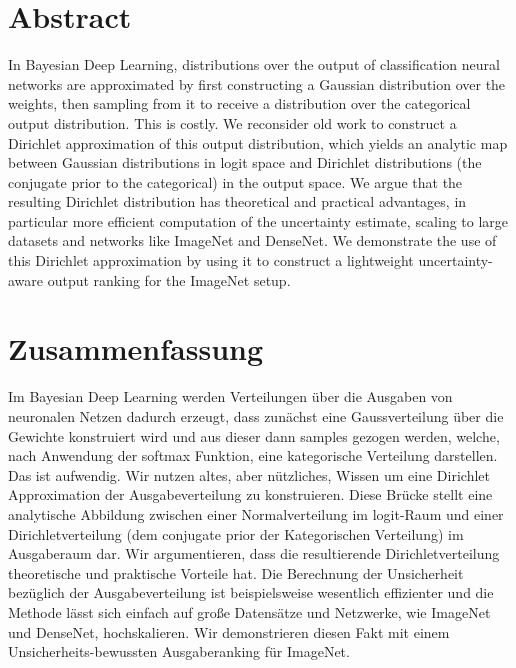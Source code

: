 \section*{Abstract}

In Bayesian Deep Learning, distributions over the output of classification neural networks are approximated by first constructing a Gaussian distribution over the weights, then sampling from it to receive a distribution over the categorical output distribution. This is costly. We reconsider old work to construct a Dirichlet approximation of this output distribution, which yields an analytic map between Gaussian distributions in logit space and Dirichlet distributions (the conjugate prior to the categorical) in the output space. We argue that the resulting Dirichlet distribution has theoretical and practical advantages, in particular more efficient computation of the uncertainty estimate, scaling to large datasets and networks like ImageNet and DenseNet. We demonstrate the use of this Dirichlet approximation by using it to construct a lightweight uncertainty-aware output ranking for the ImageNet setup. 



\newpage
\section*{Zusammenfassung}
Im Bayesian Deep Learning werden Verteilungen über die Ausgaben von neuronalen Netzen dadurch erzeugt, dass zunächst eine Gaussverteilung über die Gewichte konstruiert wird und aus dieser dann samples gezogen werden, welche, nach Anwendung der softmax Funktion, eine kategorische Verteilung darstellen. Das ist aufwendig. Wir nutzen altes, aber nützliches, Wissen um eine Dirichlet Approximation der Ausgabeverteilung zu konstruieren. Diese Brücke stellt eine analytische Abbildung zwischen einer Normalverteilung im logit-Raum und einer Dirichletverteilung (dem conjugate prior der Kategorischen Verteilung) im Ausgaberaum dar. Wir argumentieren, dass die resultierende Dirichletverteilung theoretische und praktische Vorteile hat. Die Berechnung der Unsicherheit bezüglich der Ausgabeverteilung ist beispielsweise wesentlich effizienter und die Methode lässt sich einfach auf große Datensätze und Netzwerke, wie ImageNet und DenseNet, hochskalieren. Wir demonstrieren diesen Fakt mit einem Unsicherheits-bewussten Ausgaberanking für ImageNet. 

